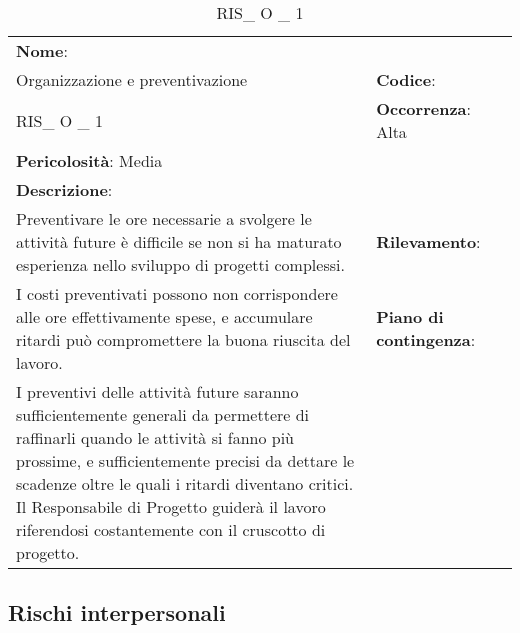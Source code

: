 \renewcommand{\arraystretch}{1.5}
\begin{longtable} { 
		>{\raggedright}p{} 
		>{\raggedright}p{} 
		>{\raggedright}p{}    }
	
	\caption{RIS\_ O \_ 1} \endhead	
	
	
	\textbf{Nome}: \\ Organizzazione e preventivazione
	& \textbf{Codice}: \\ RIS\_ O \_ 1
	& \textbf{Occorrenza}: Alta \\ \textbf{Pericolosità}: Media
	
	\tabularnewline
	
	\textbf{Descrizione}: \\ Preventivare le ore necessarie a svolgere le attività future è difficile se non si ha maturato esperienza nello sviluppo di progetti complessi.
	& 
	\textbf{Rilevamento}: \\ I costi preventivati possono non corrispondere alle ore effettivamente spese, e accumulare ritardi può compromettere la buona riuscita del lavoro.
	
	&  
	\textbf{Piano di contingenza}: \\ I preventivi delle attività future saranno sufficientemente generali da permettere di raffinarli quando le attività si fanno più prossime, e sufficientemente precisi da dettare le scadenze oltre le quali i ritardi diventano critici. Il Responsabile di Progetto guiderà il lavoro riferendosi costantemente con il cruscotto di progetto. 
	
\end{longtable}




\subsection{Rischi interpersonali}



